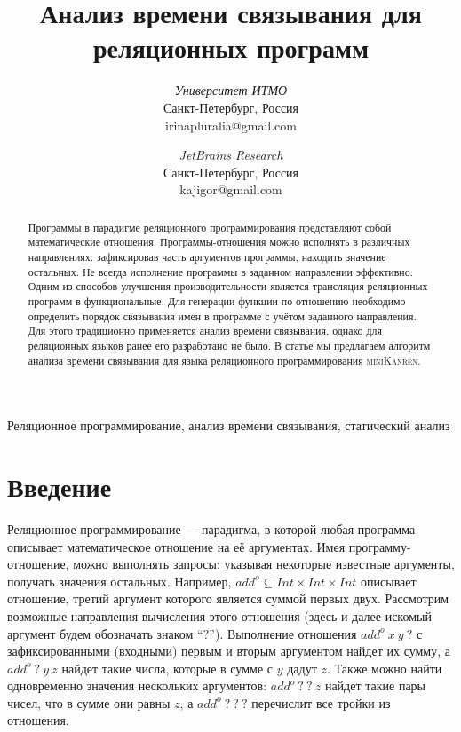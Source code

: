 \documentclass[conference,a4paper,american,russian]{IEEEtran}
\newcommand{\miniKanren}{\textsc{miniKanren}}
\begin{document}
\title{Анализ времени связывания для реляционных программ}

\author{
\textit{Университет ИТМО} \\
Санкт-Петербург, Россия \\
irinapluralia@gmail.com
\and
{}
\textit{JetBrains Research}\\
Санкт-Петербург, Россия \\
kajigor@gmail.com
}


\maketitle

\begin{abstract}
Программы в парадигме реляционного программирования представляют собой математические отношения.
Программы-отношения можно исполнять в различных направлениях: зафиксировав часть аргументов программы, находить значение остальных.
Не всегда исполнение программы в заданном направлении эффективно.
Одним из способов улучшения производительности является трансляция реляционных программ в функциональные.
Для генерации функции по отношению необходимо определить порядок связывания имен в программе с учётом заданного направления.
Для этого традиционно применяется анализ времени связывания, однако для реляционных языков ранее его разработано не было.
В статье мы предлагаем алгоритм анализа времени связывания для языка реляционного программирования \miniKanren{}.
\end{abstract}

\begin{IEEEkeywords}
Реляционное программирование, анализ времени связывания, статический анализ
\end{IEEEkeywords}

\section{Введение}

Реляционное программирование --- парадигма, в которой любая программа описывает математическое отношение на её аргументах.
Имея программу-отношение, можно выполнять запросы: указывая некоторые известные аргументы, получать значения остальных.
Например, $add^o \subseteq Int \times Int \times Int$ описывает отношение, третий аргумент которого является суммой первых двух.
Рассмотрим возможные направления вычисления этого отношения (здесь и далее искомый аргумент будем обозначать знаком ``$?$'').
Выполнение отношения $add^o  \ x \ y \ ?$ с зафиксированными (входными) первым и вторым аргументом найдет их сумму, а $add^o \ ? \ y \ z$ найдет такие числа, которые в сумме с $y$ дадут $z$.
Также можно найти одновременно значения нескольких аргументов: $add^o \ ? \ ? \ z$ найдет такие пары чисел, что в сумме они равны $z$, а $add^o \ ? \ ? \ ?$ перечислит все тройки из отношения.
\end{document}
